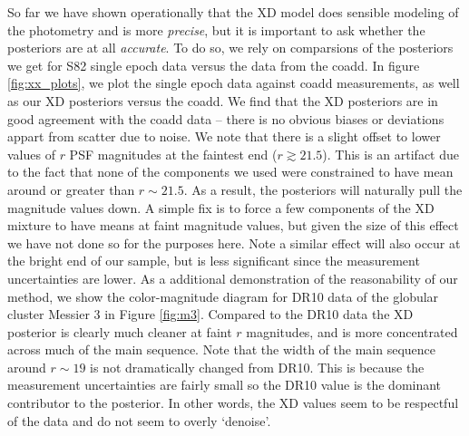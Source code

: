 \documentclass[12pt,preprint]{aastex}
\begin{document}
So far we have shown operationally that the XD model does sensible modeling of
the photometry and is more \emph{precise}, but it is important to ask whether
the posteriors are at all \emph{accurate}.  To do so, we rely on comparsions of
the posteriors we get for S82 single epoch data versus the data from the
coadd.  In figure \ref{fig:xx_plots}, we plot the single
epoch data against coadd measurements, as well as our XD posteriors versus the
coadd.  We find that the XD posteriors are in good agreement with the coadd
data -- there is no obvious biases or deviations appart from scatter due to
noise.  We note that there is a slight offset to lower values of $r$ PSF
magnitudes at the faintest end ($r \gtrsim 21.5$).  This is an artifact due to
the fact that none of the components we used were constrained to have mean
around or greater than $r \sim 21.5$.  As a result, the posteriors will
naturally pull the magnitude values down.  A simple fix is to force a few
components of the XD mixture to have means at faint magnitude values, but given
the size of this effect we have not done so for the purposes here.  Note a
similar effect will also occur at the bright end of our sample, but is less 
significant since the measurement uncertainties are lower.  As a additional 
demonstration of the reasonability of our method, we show the color-magnitude
diagram for DR10 data of the globular cluster Messier 3 in Figure
\ref{fig:m3}.  Compared to the DR10 data the XD posterior is clearly much
cleaner at faint $r$ magnitudes, and is more concentrated across much of the
main sequence.  Note that the width of the main sequence around $r \sim 19$ is
not dramatically changed from DR10.  This is because the measurement
uncertainties are fairly small so the DR10 value is the dominant contributor
to the posterior.  In other words, the XD values seem to be respectful of the 
data and do not seem to overly `denoise'.
\end{document}
